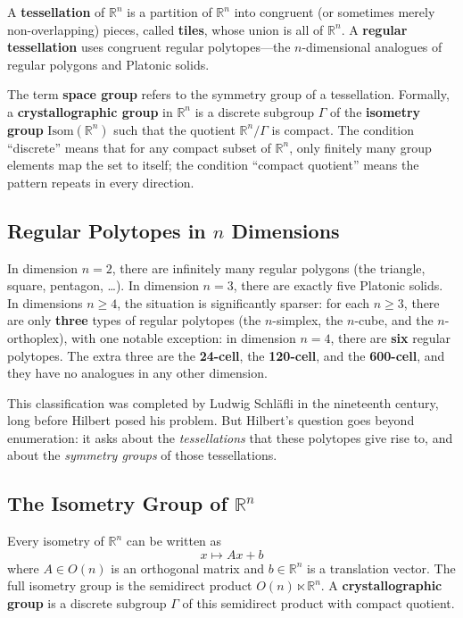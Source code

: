 A \textbf{tessellation} of $\mathbb{R}^n$ is a partition of $\mathbb{R}^n$ into congruent (or sometimes merely non-overlapping) pieces, called \textbf{tiles}, whose union is all of $\mathbb{R}^n$. A \textbf{regular tessellation} uses congruent regular polytopes---the $n$-dimensional analogues of regular polygons and Platonic solids.

The term \textbf{space group} refers to the symmetry group of a tessellation. Formally, a \textbf{crystallographic group} in $\mathbb{R}^n$ is a discrete subgroup $\Gamma$ of the \textbf{isometry group} $\mathrm{Isom}(\mathbb{R}^n)$ such that the quotient $\mathbb{R}^n / \Gamma$ is compact. The condition ``discrete'' means that for any compact subset of $\mathbb{R}^n$, only finitely many group elements map the set to itself; the condition ``compact quotient'' means the pattern repeats in every direction.

\subsection{Regular Polytopes in \texorpdfstring{$n$}{n} Dimensions}

In dimension $n = 2$, there are infinitely many regular polygons (the triangle, square, pentagon, \ldots). In dimension $n = 3$, there are exactly five Platonic solids. In dimensions $n \geq 4$, the situation is significantly sparser: for each $n \geq 3$, there are only \textbf{three} types of regular polytopes (the $n$-simplex, the $n$-cube, and the $n$-orthoplex), with one notable exception: in dimension $n = 4$, there are \textbf{six} regular polytopes. The extra three are the \textbf{24-cell}, the \textbf{120-cell}, and the \textbf{600-cell}, and they have no analogues in any other dimension.

This classification was completed by Ludwig Schläfli in the nineteenth century, long before Hilbert posed his problem. But Hilbert's question goes beyond enumeration: it asks about the \emph{tessellations} that these polytopes give rise to, and about the \emph{symmetry groups} of those tessellations.

\subsection{The Isometry Group of \texorpdfstring{$\mathbb{R}^n$}{R^n}}

Every isometry of $\mathbb{R}^n$ can be written as
\[
    x \mapsto Ax + b
\]
where $A \in O(n)$ is an orthogonal matrix and $b \in \mathbb{R}^n$ is a translation vector. The full isometry group is the semidirect product $O(n) \ltimes \mathbb{R}^n$. A \textbf{crystallographic group} is a discrete subgroup $\Gamma$ of this semidirect product with compact quotient.

